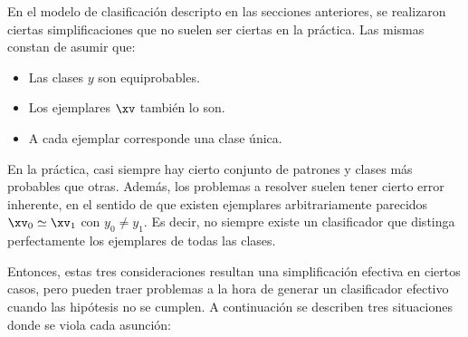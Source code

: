 En el modelo de clasificación descripto en las secciones anteriores, se realizaron ciertas simplificaciones que no suelen ser ciertas en la práctica. Las mismas constan de asumir que: 

\begin{itemize}
\item Las clases $y$ son equiprobables.
\item Los ejemplares $\xv$ también lo son.
\item A cada ejemplar corresponde una clase única.
\end{itemize}

En la práctica, casi siempre hay cierto conjunto de patrones y clases más probables que otras. Además, los problemas a resolver suelen tener cierto error inherente, en el sentido de que existen ejemplares arbitrariamente parecidos $\xv_0 \simeq \xv_1$ con  $y_0 \neq y_1$. Es decir, no siempre existe un clasificador que distinga perfectamente los ejemplares de todas las clases.

Entonces, estas tres consideraciones resultan una simplificación efectiva en ciertos casos, pero pueden traer problemas a la hora de generar un clasificador efectivo cuando las hipótesis no se cumplen. A continuación se describen tres situaciones donde se viola cada asunción: 
 
